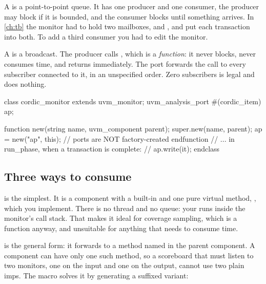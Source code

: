 A  is a point-to-point queue. It has one producer and one
consumer, the producer may block if it is bounded, and the consumer blocks
until something arrives. In \cref{ch:tb} the monitor had to hold two
mailboxes,  and , and put each transaction into
both. To add a third consumer you had to edit the monitor.

A  is a broadcast. The producer calls
, which is a \emph{function}: it never blocks, never consumes
time, and returns immediately. The port forwards the call to every subscriber
connected to it, in an unspecified order. Zero subscribers is legal and does
nothing.

\begin{uvmcode}[caption={Producing on an analysis port},label={lst:uvm:ap}]
class cordic_monitor extends uvm_monitor;
  uvm_analysis_port #(cordic_item) ap;

  function new(string name, uvm_component parent);
    super.new(name, parent);
    ap = new("ap", this);    // ports are NOT factory-created
  endfunction
  // ... in run_phase, when a transaction is complete:
  //     ap.write(it);
endclass
\end{uvmcode}

\subsection{Three ways to consume}

%
\textbf{} is the simplest. It is a component with
a built-in  and one pure virtual method,
, which you implement. There is no thread and no queue: your
 runs inside the monitor's call stack. That makes it ideal for
coverage sampling, which is a function anyway, and unsuitable for anything
that needs to consume time.

%
\textbf{} is the general form: it
forwards  to a method named  in the parent
component. A component can have only one such method, so a scoreboard that
must listen to two monitors, one on the input and one on the output, cannot
use two plain imps. The macro
 solves it by generating a suffixed variant:

